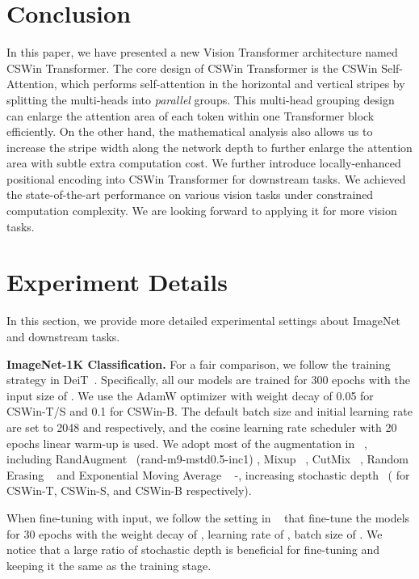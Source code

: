 \documentclass[10pt,twocolumn,letterpaper]{article}
\begin{document}
\section{Conclusion}
In this paper, we have presented a new Vision Transformer architecture named CSWin Transformer. The core design of CSWin Transformer is the CSWin Self-Attention, which performs self-attention in the horizontal and vertical stripes by splitting the multi-heads into \emph{parallel} groups. This multi-head grouping design can enlarge the attention area of each token within one Transformer block efficiently. On the other hand, the mathematical analysis also allows us to increase the stripe width along the network depth to further enlarge the attention area with subtle extra computation cost. We further introduce locally-enhanced positional encoding into CSWin Transformer for downstream tasks.  We achieved the state-of-the-art performance on various vision tasks under constrained computation complexity. We are  looking forward to applying it for more vision tasks. 


{\small


}


\newpage
\section*{Experiment Details}
In this section, we provide more detailed experimental settings about ImageNet and downstream tasks.

\noindent \textbf{ImageNet-1K Classification.}
For a fair comparison, we follow the training strategy in DeiT~\cite{touvron2020deit}. Specifically, all our models are trained for 300 epochs with the input size of . We use the AdamW optimizer with weight decay of 0.05 for CSWin-T/S and 0.1 for CSWin-B. The default batch size and initial learning rate are set to 2048 and  respectively, and the cosine learning rate scheduler with 20 epochs linear warm-up is used. We adopt most of the augmentation in ~\cite{touvron2020deit}, including RandAugment~\cite{cubuk2019randaugment} (rand-m9-mstd0.5-inc1) , Mixup~\cite{zhang2018mixup} , CutMix~\cite{yun2019cutmix} , Random Erasing ~\cite{zhong2017randomerase}  and  Exponential Moving Average ~\cite{polyak1992ema} -, increasing stochastic depth~\cite{huang2016deep} ( for  CSWin-T, CSWin-S, and CSWin-B respectively).

When fine-tuning with  input, we follow the setting in ~\cite{liu2021swin} that fine-tune the models for 30 epochs with the weight decay of ,  learning rate of , batch size of . We notice that a large ratio of stochastic depth is beneficial for fine-tuning and keeping it the same as the training stage.
\end{document}
